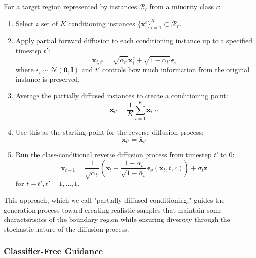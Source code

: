 \documentclass{article}
\begin{document}
For a target region represented by instances $\mathcal{R}_r$ from a minority class $c$:

\begin{enumerate}
    \item Select a set of $K$ conditioning instances $\{\mathbf{x}_i^c\}_{i=1}^K \subset \mathcal{R}_r$.

    \item Apply partial forward diffusion to each conditioning instance up to a specified timestep $t'$:
    \begin{equation}
    \mathbf{x}_{i,t'} = \sqrt{\bar{\alpha}_{t'}} \mathbf{x}_i^c + \sqrt{1 - \bar{\alpha}_{t'}} \boldsymbol{\epsilon}_i
    \end{equation}
    where $\boldsymbol{\epsilon}_i \sim \mathcal{N}(\mathbf{0}, \mathbf{I})$ and $t'$ controls how much information from the original instance is preserved.

    \item Average the partially diffused instances to create a conditioning point:
    \begin{equation}
    \bar{\mathbf{x}}_{t'} = \frac{1}{K} \sum_{i=1}^K \mathbf{x}_{i,t'}
    \end{equation}

    \item Use this as the starting point for the reverse diffusion process:
    \begin{equation}
    \mathbf{x}_{t'} = \bar{\mathbf{x}}_{t'}
    \end{equation}

    \item Run the class-conditional reverse diffusion process from timestep $t'$ to $0$:
    \begin{equation}
    \mathbf{x}_{t-1} = \frac{1}{\sqrt{\alpha_t}} \left( \mathbf{x}_t - \frac{1-\alpha_t}{\sqrt{1-\bar{\alpha}_t}} \boldsymbol{\epsilon}_\theta(\mathbf{x}_t, t, c) \right) + \sigma_t \mathbf{z}
    \end{equation}
    for $t = t', t'-1, \ldots, 1$.
\end{enumerate}

This approach, which we call "partially diffused conditioning," guides the generation process toward creating realistic samples that maintain some characteristics of the boundary region while ensuring diversity through the stochastic nature of the diffusion process.

\subsubsection{Classifier-Free Guidance}
\label{ssec:classifier_free_guidance}
\end{document}
